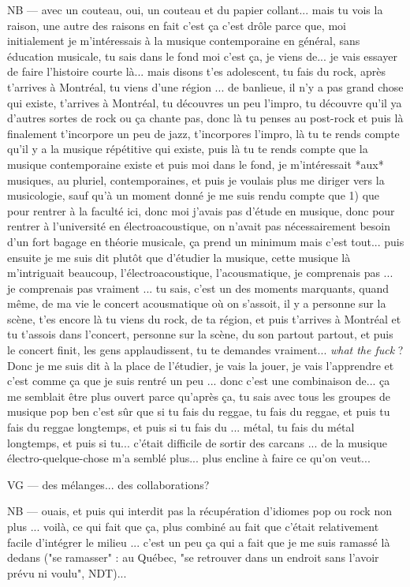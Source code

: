 NB — avec un couteau, oui, un couteau et du papier collant... mais tu vois la raison, une autre des raisons en fait c'est ça c'est drôle parce que, moi initialement je m'intéressais à la musique contemporaine en général, sans éducation musicale, tu sais dans le fond moi c'est ça, je viens de... je vais essayer de faire l'histoire courte là... mais disons t'es adolescent, tu fais du rock, après t'arrives à Montréal, tu viens d'une région ... de banlieue, il n'y a pas grand chose qui existe, t'arrives à Montréal, tu découvres un peu l'impro, tu découvre qu'il ya d'autres sortes de rock ou ça chante pas, donc là tu penses au post-rock et puis là finalement t'incorpore un peu de jazz, t'incorpores l'impro, là tu te rends compte qu'il y a la musique répétitive qui existe, puis là tu te rends compte que la musique contemporaine existe et puis moi dans le fond, je m'intéressait *aux* musiques, au pluriel, contemporaines, et puis je voulais plus me diriger vers la musicologie, sauf qu'à un moment donné je me suis rendu compte que 1) que pour rentrer à la faculté ici, donc moi j'avais pas d'étude en musique, donc pour rentrer à l'université en électroacoustique, on n'avait pas nécessairement besoin d'un fort bagage en théorie musicale, ça prend un minimum mais c'est tout... puis ensuite je me suis dit plutôt que d'étudier la musique, cette musique là m'intriguait beaucoup, l'électroacoustique, l'acousmatique, je comprenais pas ... je comprenais pas vraiment ... tu sais, c'est un des moments marquants, quand même, de ma vie le concert acousmatique où on s'assoit, il y a personne sur la scène, t'es encore là tu viens du rock, de ta région, et puis t'arrives à Montréal et tu t'assois dans l'concert, personne sur la scène, du son partout partout, et puis le concert finit, les gens applaudissent,  tu te demandes vraiment... \textit{what the fuck} ?  Donc je me suis dit à la place de l'étudier, je vais la jouer, je vais l'apprendre et c'est comme ça que je suis rentré un peu ... donc c'est une combinaison de... ça me semblait être plus ouvert parce qu'après ça, tu sais avec tous les groupes de musique pop ben c'est sûr que si tu fais du reggae, tu fais du reggae, et puis tu fais du reggae longtemps, et puis si tu fais du ... métal, tu fais du métal longtemps, et puis si tu...  c'était difficile de sortir des carcans ... de la musique électro-quelque-chose m'a semblé plus... plus encline à faire ce qu'on veut... 

VG — des mélanges... des collaborations?

NB — ouais, et puis qui interdit pas la récupération d'idiomes pop ou rock non plus ... voilà, ce qui fait que ça, plus combiné au fait que c'était relativement facile d'intégrer le milieu ... c'est un peu ça qui a fait que je me suis ramassé là dedans ("se ramasser" : au Québec, "se retrouver dans un endroit sans l'avoir prévu ni voulu", NDT)...

